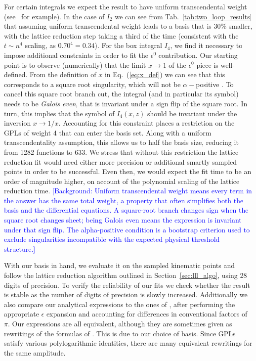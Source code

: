 \documentclass[a4paper,11pt]{article}
\begin{document}
For certain integrals we expect the result to have uniform transcendental weight (see~\cite{Arkani-Hamed:2010pyv} for example). In the case of $I_2$ we can see  from Tab.~\ref{tab:two_loop_results} that assuming uniform transcendental weight leads to a basis that is $30\%$ smaller, with the lattice reduction step taking a third of the time (consistent with the $t\sim n^4$ scaling, as $0.70^4=0.34$). For the box integral $I_4$, we find it necessary to impose additional constraints in order to fit the $\epsilon^0$ contribution. Our starting point is to observe (numerically) that the limit $x\rightarrow 1$ of the $\epsilon^0$ piece is well-defined. From the definition of $x$ in Eq.~(\ref{eq:x_def}) we can see that this corresponds to a square root singularity, which will not be $\alpha-$positive \cite{Hannesdottir:2024hke}. To cancel this square root branch cut, the integral (and in particular its symbol) needs to be \textit{Galois even}, that is invariant under a sign flip of the square root. In turn, this implies that the symbol of $I_4(x,z)$  should be invariant under the inversion $x\rightarrow 1/x$. Accounting for this constraint places a restriction on the GPLs of weight 4 that can enter the basis set. Along with a uniform transcendentality assumption, this allows us to half the basis size, reducing it from 1282 functions to 633. We stress that without this restriction the lattice reduction fit would need either more precision or additional smartly sampled points in order to be successful. Even then, we would expect the fit time to be an order of magnitude higher, on account of the polynomial scaling of the lattice reduction time.
\textcolor{blue}{\small [Background: Uniform transcendental weight means every term in the answer has the same total weight, a property that often simplifies both the basis and the differential equations. A square-root branch changes sign when the square root changes sheet; being Galois even means the expression is invariant under that sign flip. The alpha-positive condition is a bootstrap criterion used to exclude singularities incompatible with the expected physical threshold structure.]}



With our basis in hand, we evaluate it on the sampled kinematic points and follow the lattice reduction algorithm outlined in Section~\ref{sec:lll_algo}, using 28 digits of precision. To verify the reliability of our fits we check whether the result is stable as the number of digits of precision is slowly increased. Additionally we also compare our analytical expressions to the ones of \cite{Gehrmann:2013cxs}, after performing the appropriate $\epsilon$ expansion and accounting for differences in conventional factors of $\pi$. Our expressions are all equivalent, although they are sometimes given as rewritings of the formulas of \cite{Gehrmann:2013cxs}. This is due to our choice of basis. Since GPLs satisfy various polylogarithmic identities, there are many equivalent rewritings for the same amplitude. 
\end{document}

